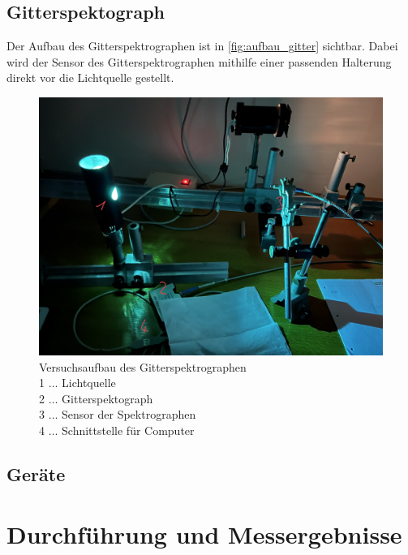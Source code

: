 \documentclass[12pt,english,ngerman]{scrartcl}
\begin{document}
\subsection{Gitterspektograph}

Der Aufbau des Gitterspektrographen ist in \autoref{fig:aufbau_gitter} sichtbar. Dabei wird der Sensor des Gitterspektrographen
mithilfe einer passenden Halterung direkt vor die Lichtquelle gestellt.
\begin{figure}[H]
	\begin{center}
		\includegraphics[width =\textwidth]{./figures/Gitterspektograph.png}
	\end{center}
	\caption[Versuchsaufbau des Gitterspektrographen]
	{Versuchsaufbau des Gitterspektrographen \\
	1 \(\dots\) Lichtquelle \\
	2 \(\dots\) Gitterspektograph \\
	3 \(\dots\) Sensor der Spektrographen \\
	4 \(\dots\) Schnittstelle für Computer
	}\label{fig:aufbau_gitter}
\end{figure}


\subsection{Geräte}



\section{Durchführung und Messergebnisse}\label{sec:durchführung}
\end{document}
